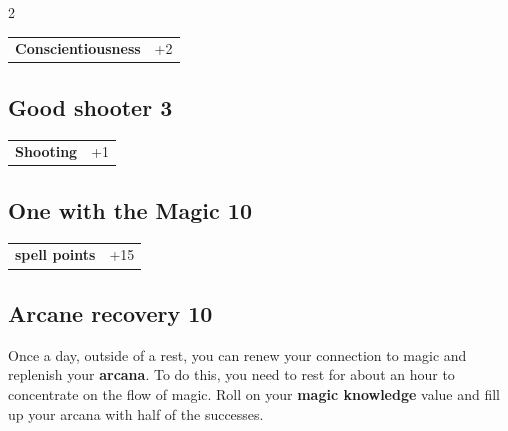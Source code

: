 \begin{multicols}{2}
\begin{tcolorbox}
\begin{tabular}{@{}ll@{}}
    \textbf{Conscientiousness} & +2\\
\end{tabular}


\end{tcolorbox}

\begin{tcolorbox}
    \subsection*{Good shooter \hfill \small{3 }}
    \tcblower




\begin{tabular}{@{}ll@{}}
    \textbf{Shooting} & +1\\
\end{tabular}


\end{tcolorbox}

\begin{tcolorbox}
    \subsection*{One with the Magic \hfill \small{10 }}
    \tcblower




\begin{tabular}{@{}ll@{}}
    \textbf{spell points} & +15\\
\end{tabular}


\end{tcolorbox}

\begin{tcolorbox}
    \subsection*{Arcane recovery \hfill \small{10 }}
    \tcblower
Once a day, outside of a rest, you can renew your connection to magic and replenish your \textbf{arcana}. To do this, you need to rest for about an hour to concentrate on the flow of magic.
Roll on your \textbf{magic knowledge} value and fill up your arcana with half of the successes.



\end{tcolorbox}
\end{multicols}
